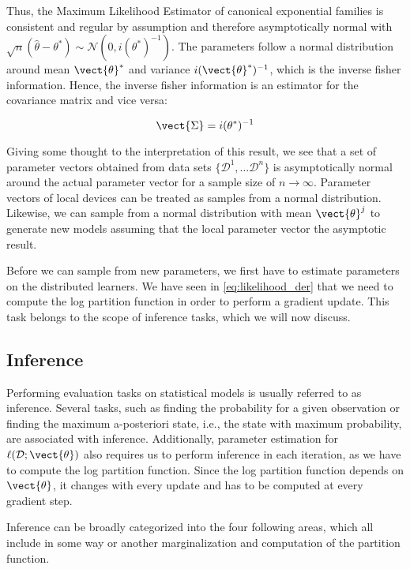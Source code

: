         Thus, the Maximum Likelihood Estimator of canonical exponential families is consistent and  regular by assumption and therefore asymptotically normal with $\sqrt{n}(\hat{\theta} - \theta^*) \sim \mathcal{N}(0, i(\theta^*)^{-1})$.
        The parameters follow a normal distribution around mean $\vect{\theta}^*$ and variance $i(\vect{\theta}^*)^{-1}$, which is the inverse fisher information.
        Hence, the inverse fisher information is an estimator for the covariance matrix and vice versa:
        
        \begin{equation}
            \vect{\Sigma} =  i(\theta^*)^{-1}
        \end{equation}

        Giving some thought to the interpretation of this result, we see that a set of parameter vectors obtained from data sets $\{\mathcal{D}^1, \ldots \mathcal{D}^n\}$ is asymptotically normal around the actual parameter vector for a sample size of $n \rightarrow \infty$.
        Parameter vectors of local devices can be treated as samples from a normal distribution.
        Likewise, we can sample from a normal distribution with mean $\vect{\theta}^j$ to generate new models assuming that the local parameter vector the asymptotic result.
        
        Before we can sample from new parameters, we first have to estimate parameters on the distributed learners. 
        We have seen in \autoref{eq:likelihood_der} that we need to compute the log partition function in order to perform a gradient update.
        This task belongs to the scope of inference tasks, which we will now discuss.

\subsection{Inference}
\label{ssec:inf}
Performing evaluation tasks on statistical models is usually referred to as inference.
Several tasks, such as finding the probability for a given observation or finding the maximum a-posteriori state, i.e., the state with maximum probability, are associated with inference.
Additionally, parameter estimation for $\ell(\mathcal{D}; \vect{\theta})$ also requires us to perform inference in each iteration, as we have to compute the log partition function.
Since the log partition function depends on $\vect{\theta}$, it changes with every update and has to be computed at every gradient step.

Inference can be broadly categorized into the four following areas, which all include in some way or another marginalization and computation of the partition function.

